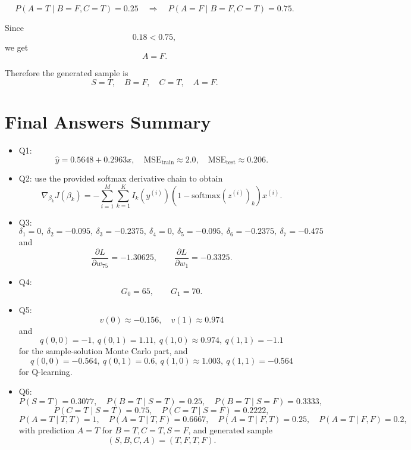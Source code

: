 \documentclass[11pt]{article}
\begin{document}
\[
    P(A=T\mid B=F,C=T)=0.25
    \quad\Rightarrow\quad
    P(A=F\mid B=F,C=T)=0.75.
\]

Since
\[
    0.18 < 0.75,
\]
we get
\[
    A=F.
\]

Therefore the generated sample is
\[
    \boxed{
    S=T,\quad B=F,\quad C=T,\quad A=F.
    }
\]

\section*{Final Answers Summary}

\begin{itemize}
    \item Q1:
    \[
        \hat y = 0.5648 + 0.2963x,\quad
        \text{MSE}_{\text{train}}\approx 2.0,\quad
        \text{MSE}_{\text{test}}\approx 0.206.
    \]
    \item Q2: use the provided softmax derivative chain to obtain
    \[
        \nabla_{\beta_k}J(\beta_k)
        =
        -\sum_{i=1}^{M}\sum_{k=1}^{K}
        I_k(y^{(i)})
        \left(1-\text{softmax}(z^{(i)})_k\right)x^{(i)}.
    \]
    \item Q3:
    \[
        \delta_1=0,\ \delta_2=-0.095,\ \delta_3=-0.2375,\ \delta_4=0,\ 
        \delta_5=-0.095,\ \delta_6=-0.2375,\ \delta_7=-0.475
    \]
    and
    \[
        \frac{\partial L}{\partial w_{75}}=-1.30625,\qquad
        \frac{\partial L}{\partial w_1}=-0.3325.
    \]
    \item Q4:
    \[
        G_0=65,\qquad G_1=70.
    \]
    \item Q5:
    \[
        v(0)\approx -0.156,\quad v(1)\approx 0.974
    \]
    and
    \[
        q(0,0)=-1,\ q(0,1)=1.11,\ q(1,0)\approx 0.974,\ q(1,1)=-1.1
    \]
    for the sample-solution Monte Carlo part, and
    \[
        q(0,0)=-0.564,\ q(0,1)=0.6,\ q(1,0)\approx 1.003,\ q(1,1)=-0.564
    \]
    for Q-learning.
    \item Q6:
    \[
        P(S=T)=0.3077,\quad
        P(B=T\mid S=T)=0.25,\quad
        P(B=T\mid S=F)=0.3333,
    \]
    \[
        P(C=T\mid S=T)=0.75,\quad
        P(C=T\mid S=F)=0.2222,
    \]
    \[
        P(A=T\mid T,T)=1,\quad
        P(A=T\mid T,F)=0.6667,\quad
        P(A=T\mid F,T)=0.25,\quad
        P(A=T\mid F,F)=0.2,
    \]
    with prediction \(A=T\) for \(B=T,C=T,S=F\), and generated sample
    \[
        (S,B,C,A)=(T,F,T,F).
    \]
\end{itemize}
\end{document}
